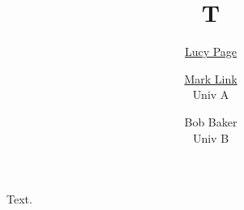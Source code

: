 \documentclass{article}
\title{T}
\author{\href{https://x.org/lp}{Lucy Page} \and \href{https://orcid.org/0000-0001}{Mark Link}\\ Univ A \and Bob Baker \\ Univ B}
\begin{document}
\maketitle
Text.
\end{document}
